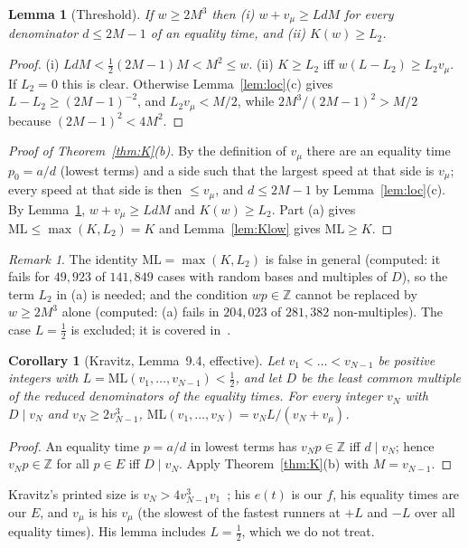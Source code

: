 \documentclass[11pt]{article}
\newtheorem{lemma}[theorem]{Lemma}
\newtheorem{corollary}[theorem]{Corollary}
\theoremstyle{definition}
\theoremstyle{remark}
\newtheorem{remark}[theorem]{Remark}
\newcommand{\ML}{\mathrm{ML}}
\newcommand{\ZZ}{\mathbb{Z}}
\begin{document}
\begin{lemma}[Threshold]\label{lem:thr}
If $w\ge2M^3$ then (i) $w+v_\mu\ge LdM$ for every denominator $d\le2M-1$ of an equality time, and (ii) $K(w)\ge L_2$.
\end{lemma}
\begin{proof}
(i) $LdM<\frac12(2M-1)M<M^2\le w$. (ii) $K\ge L_2$ iff $w(L-L_2)\ge L_2v_\mu$. If $L_2=0$ this is clear. Otherwise Lemma~\ref{lem:loc}(c) gives $L-L_2\ge(2M-1)^{-2}$, and $L_2v_\mu<M/2$, while $2M^3/(2M-1)^2>M/2$ because $(2M-1)^2<4M^2$.
\end{proof}

\begin{proof}[Proof of Theorem~\ref{thm:K}(b)]
By the definition of $v_\mu$ there are an equality time $p_0=a/d$ (lowest terms) and a side such that the largest speed at that side is $v_\mu$; every speed at that side is then $\le v_\mu$, and $d\le2M-1$ by Lemma~\ref{lem:loc}(c). By Lemma~\ref{lem:thr}, $w+v_\mu\ge LdM$ and $K(w)\ge L_2$. Part (a) gives $\ML\le\max(K,L_2)=K$ and Lemma~\ref{lem:Klow} gives $\ML\ge K$.
\end{proof}

\begin{remark}
The identity $\ML=\max(K,L_2)$ is false in general (computed: it fails for $49{,}923$ of $141{,}849$ cases with random bases and multiples of $D$), so the term $L_2$ in (a) is needed; and the condition $wp\in\ZZ$ cannot be replaced by $w\ge2M^3$ alone (computed: (a) fails in $204{,}023$ of $281{,}382$ non-multiples). The case $L=\frac12$ is excluded; it is covered in~\cite{K}.
\end{remark}

\begin{corollary}[Kravitz, Lemma~9.4, effective]\label{cor:K94}
Let $v_1<\dots<v_{N-1}$ be positive integers with $L=\ML(v_1,\dots,v_{N-1})<\frac12$, and let $D$ be the least common multiple of the reduced denominators of the equality times. For every integer $v_N$ with $D\mid v_N$ and $v_N\ge2v_{N-1}^3$, $\ML(v_1,\dots,v_N)=v_NL/(v_N+v_\mu)$.
\end{corollary}
\begin{proof}
An equality time $p=a/d$ in lowest terms has $v_Np\in\ZZ$ iff $d\mid v_N$; hence $v_Np\in\ZZ$ for all $p\in E$ iff $D\mid v_N$. Apply Theorem~\ref{thm:K}(b) with $M=v_{N-1}$.
\end{proof}
Kravitz's printed size is $v_N>4v_{N-1}^3v_1$~\cite[Lemma~9.4 and the remark following it]{K}; his $e(t)$ is our $f$, his equality times are our $E$, and $v_\mu$ is his $v_\mu$ (the slowest of the fastest runners at $+L$ and $-L$ over all equality times). His lemma includes $L=\frac12$, which we do not treat.
\end{document}
